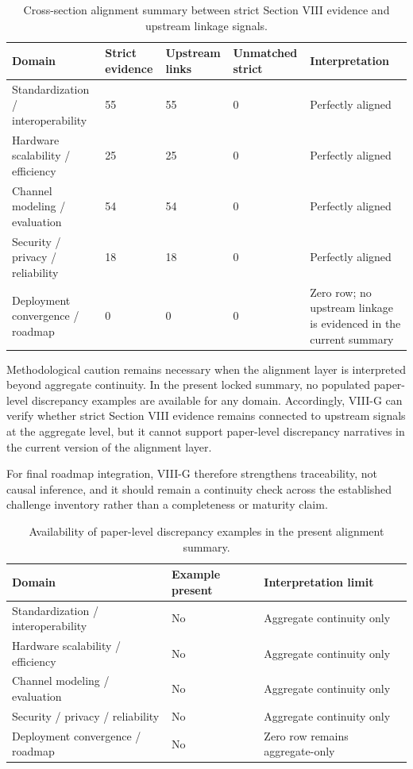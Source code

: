 \begin{table}[htbp]
\caption{Cross-section alignment summary between strict Section VIII evidence and upstream linkage signals.}
\label{tab:viii_g_1}
\centering
\setlength{\tabcolsep}{4pt}
\renewcommand{\arraystretch}{1.08}
\begin{tabularx}{\textwidth}{L{3.6cm} C{1.6cm} C{1.8cm} C{1.8cm} Y}
\toprule
Domain & Strict evidence & Upstream links & Unmatched strict & Interpretation \\
\midrule
Standardization / interoperability & 55 & 55 & 0 & Perfectly aligned \\
Hardware scalability / efficiency & 25 & 25 & 0 & Perfectly aligned \\
Channel modeling / evaluation & 54 & 54 & 0 & Perfectly aligned \\
Security / privacy / reliability & 18 & 18 & 0 & Perfectly aligned \\
Deployment convergence / roadmap & 0 & 0 & 0 & Zero row; no upstream linkage is evidenced in the current summary \\
\bottomrule
\end{tabularx}
\end{table}

Methodological caution remains necessary when the alignment layer is interpreted beyond aggregate continuity. In the present locked summary, no populated paper-level discrepancy examples are available for any domain. Accordingly, VIII-G can verify whether strict Section VIII evidence remains connected to upstream signals at the aggregate level, but it cannot support paper-level discrepancy narratives in the current version of the alignment layer.

For final roadmap integration, VIII-G therefore strengthens traceability, not causal inference, and it should remain a continuity check across the established challenge inventory rather than a completeness or maturity claim.

\begin{table}[htbp]
\caption{Availability of paper-level discrepancy examples in the present alignment summary.}
\label{tab:viii_g_2}
\centering
\setlength{\tabcolsep}{4pt}
\renewcommand{\arraystretch}{1.08}
\begin{tabularx}{\textwidth}{L{3.6cm} C{2.0cm} Y}
\toprule
Domain & Example present & Interpretation limit \\
\midrule
Standardization / interoperability & No & Aggregate continuity only \\
Hardware scalability / efficiency & No & Aggregate continuity only \\
Channel modeling / evaluation & No & Aggregate continuity only \\
Security / privacy / reliability & No & Aggregate continuity only \\
Deployment convergence / roadmap & No & Zero row remains aggregate-only \\
\bottomrule
\end{tabularx}
\end{table}
